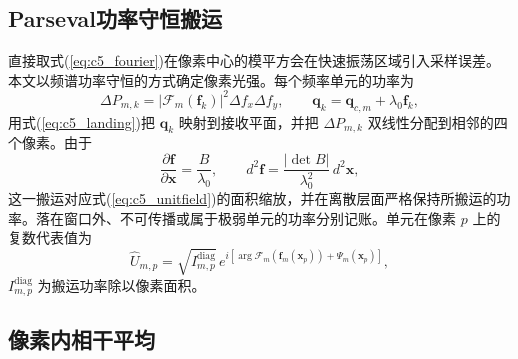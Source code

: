 \subsection{Parseval功率守恒搬运}

直接取式(\ref{eq:c5_fourier})在像素中心的模平方会在快速振荡区域引入采样误差。本文以频谱功率守恒的方式确定像素光强。每个频率单元的功率为
\begin{equation}
\Delta P_{m,k}=|\mathcal F_m(\mathbf f_k)|^2\Delta f_x\Delta f_y,\qquad
\mathbf q_k=\mathbf q_{c,m}+\lambda_0\mathbf f_k,
\label{eq:c5_bin}
\end{equation}
用式(\ref{eq:c5_landing})把 $\mathbf q_k$ 映射到接收平面，并把 $\Delta P_{m,k}$ 双线性分配到相邻的四个像素。由于
\begin{equation}
\frac{\partial\mathbf f}{\partial\mathbf x}=\frac{B}{\lambda_0},\qquad
d^2\mathbf f=\frac{|\det B|}{\lambda_0^2}\,d^2\mathbf x,
\label{eq:c5_parseval}
\end{equation}
这一搬运对应式(\ref{eq:c5_unitfield})的面积缩放，并在离散层面严格保持所搬运的功率。落在窗口外、不可传播或属于极弱单元的功率分别记账。单元在像素 $p$ 上的复数代表值为
\begin{equation}
\widehat U_{m,p}=\sqrt{I_{m,p}^{\mathrm{diag}}}\,e^{i[\arg\mathcal F_m(\mathbf f_m(\mathbf x_p))+\Psi_m(\mathbf x_p)]},
\label{eq:c5_phasor}
\end{equation}
$I_{m,p}^{\mathrm{diag}}$ 为搬运功率除以像素面积。

\subsection{像素内相干平均}

